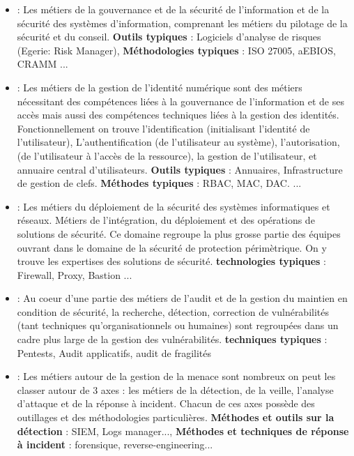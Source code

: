  \begin{itemize}
  \item \textbf{} : Les métiers de la gouvernance et de la sécurité de l'information et de la sécurité des systèmes d'information, comprenant les métiers du pilotage de la sécurité et du conseil. \textbf{Outils typiques} : Logiciels d'analyse de risques (Egerie: Risk Manager),  \textbf{Méthodologies typiques} : ISO 27005, \gls{aEBIOS}, CRAMM ... %
  
  \item \textbf{ }: Les métiers de la gestion de l'identité numérique sont des métiers nécessitant des compétences liées à la gouvernance de l'information et de ses accès mais aussi des compétences techniques liées à la gestion des identités. Fonctionnellement on trouve l'identification (initialisant l'identité de l'utilisateur),  L’authentification (de l’utilisateur au système), l’autorisation, (de l'utilisateur à l'accès de la ressource), la gestion de l’utilisateur, et annuaire central d’utilisateurs. \textbf{Outils typiques} : Annuaires, Infrastructure de gestion de clefs.  \textbf{Méthodes typiques} : RBAC, MAC, DAC. ...
  \item \textbf{} : Les métiers du déploiement  de la sécurité des systèmes informatiques et réseaux. Métiers de l'intégration, du déploiement et des opérations de solutions de sécurité. Ce domaine regroupe la plus grosse partie des équipes ouvrant dans le domaine de la sécurité de protection périmètrique. On y trouve les expertises des solutions de sécurité.   \textbf{technologies typiques} :  Firewall, Proxy, Bastion ... 
  \item\textbf{ } : Au coeur d'une partie des métiers de l'audit et de la gestion du maintien en condition de sécurité, la recherche, détection, correction de vulnérabilités (tant techniques qu'organisationnels ou humaines) sont regroupées dans un cadre plus large de la gestion des vulnérabilités. \textbf{techniques typiques} : Pentests, Audit applicatifs, audit de fragilités
  \item \textbf{} : Les métiers autour de la gestion de la menace sont nombreux on peut les classer  autour de 3 axes : les métiers de la détection, de la veille, l'analyse d'attaque et de la réponse à incident. Chacun de ces axes possède des outillages et des méthodologies particulières.  \textbf{Méthodes et outils sur la détection} : SIEM, Logs manager..., \textbf{Méthodes et techniques de réponse à incident} : forensique, reverse-engineering...

\end{itemize}

